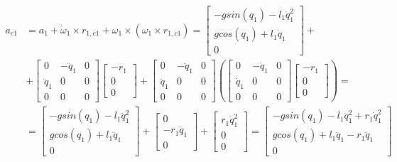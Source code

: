 \documentclass[a4paper,14pt]{extreport}
\begin{document}
\begin{itemize}
\begin{align*}
	a_{c1} &= a_1 + \dot \omega_1 \times r_{1,c1} + \omega_1 \times (\omega_1 \times r_{1,c1})
	=
		\begin{bmatrix}
			-g sin(q_1) - l_1 \ddot q_1^2\\
			g cos(q_1) + l_1 \ddot q_1\\
			0
		\end{bmatrix}+\\
	&+
		\begin{bmatrix}
			0 & -\ddot q_1 & 0\\
			\ddot q_1 & 0 & 0\\
			0&0&0
		\end{bmatrix}
		\begin{bmatrix}
			-r_1\\
			0\\
			0
		\end{bmatrix}
	+
		\begin{bmatrix}
			0 & -\ddot q_1 & 0\\
			\ddot q_1 & 0 & 0\\
			0&0&0
		\end{bmatrix}
	\left(
		\begin{bmatrix}
			0 & -\dot q_1 & 0\\
			\dot q_1 & 0 & 0\\
			0&0&0
		\end{bmatrix}
		\begin{bmatrix}
		-r_1\\
		0\\
		0
		\end{bmatrix}
	\right) 
	=\\
	&=
	\begin{bmatrix}
	-g sin(q_1) - l_1 \ddot q_1^2\\
	g cos(q_1) + l_1 \ddot q_1\\
	0
	\end{bmatrix}
	+
	\begin{bmatrix}
	0\\
	-r_1 \ddot q_1\\
	0
	\end{bmatrix}
	+
	\begin{bmatrix}
	r_1 \dot q_1^2\\
	0\\
	0
	\end{bmatrix}
	=
	\begin{bmatrix}
	-g sin(q_1) -l_1 \ddot q_1^2 + r_1 \dot q_1^2\\
	g cos(q_1) + l_1 \ddot q_1 - r_1 \ddot q_1\\
	0
	\end{bmatrix}	
\end{align*}


\end{itemize}
\end{document}
